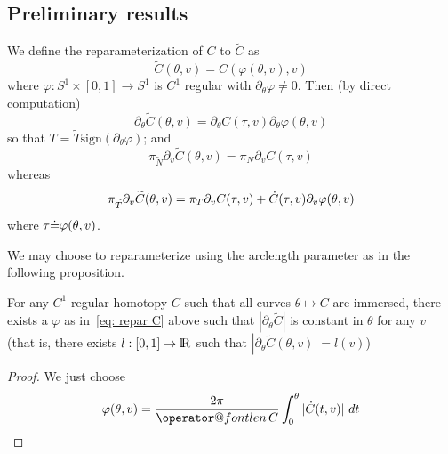 \documentclass[twoside,a4paper,english]{article}
\makeatletter
\def\derpar#1{\partial_{#1}}
\def\len{\mathop{\operator@font len}\nolimits}
\makeatother
\begin{document}
\subsection{Preliminary results}
\label{sec: para}

\begin{Definition}[Reparameterization]\label{prop: C repar}
  We define the reparameterization of $C$ to $\widetilde C$ as
  \begin{equation}
    \widetilde C(\theta,v)= C( \varphi(\theta,v),v)\label{eq: repar C}
  \end{equation}
  where $\varphi:S^1\times[0,1] \to S^1$ is $C^1$ regular
  with $\derpar \theta \varphi\neq 0$.
  Then (by direct computation)
  \begin{equation}
    \derpar \theta \widetilde C (\theta,v)=
    \derpar \theta   C( \tau,v)\derpar\theta\varphi(\theta,v)
  \end{equation}
  so that $T=\widetilde T\text{sign}(\derpar \theta \varphi) $;  and
  \begin{equation}
    \pi_{\widetilde N}\derpar v \widetilde C (\theta,v)=
    \pi_N\derpar v   C( \tau,v)
    \label{eq: pi d v C and repar}
  \end{equation}
  whereas
  \begin{equation}
    \pi_{\widetilde T}\derpar v \widetilde C (\theta,v)=
    \pi_T\derpar v   C( \tau,v)
    +\overdot C(\tau,v)\derpar v\varphi(\theta,v)
    \label{eq: pi T d v C and repar}
  \end{equation}
  where $\tau{\stackrel{\mbox{.}}{=}}\varphi(\theta,v)$.
\end{Definition}


We may choose to reparameterize using the arclength parameter as in the
following proposition.
\begin{Proposition}\label{prop: by arc par}
  For any $C^1$ regular homotopy $C$ such that all curves $\theta\mapsto C$
  are immersed,
  there exists a $\varphi$ as in~\eqref{eq: repar C} above
  such that $|\derpar\theta\widetilde C|$ is constant in $\theta$ for any $v$
  (that is, there exists $l:[0,1]\to{\protect\mathrm{l\hskip-0.15em R}}$ such that 
  $|\derpar\theta \widetilde C(\theta,v)|=l(v)$)
  \begin{proof}
    We just choose 
    \[ \varphi (\theta,v) = \frac{2\pi}{\len C}\int_0^\theta |\dot C(t,v)|~dt \]
  \end{proof}
\end{Proposition}
\end{document}
